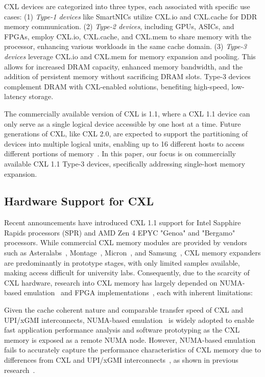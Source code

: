 CXL devices are categorized into three types, each associated with specific use cases: (1) \textit{Type-1 devices} like SmartNICs utilize CXL.io and CXL.cache for DDR memory communication. (2) \textit{Type-2 devices}, including GPUs, ASICs, and FPGAs, employ CXL.io, CXL.cache, and CXL.mem to share memory with the processor, enhancing various workloads in the same cache domain. (3) \textit{Type-3 devices} leverage CXL.io and CXL.mem for memory expansion and pooling. This allows for increased DRAM capacity, enhanced memory bandwidth, and the addition of persistent memory without sacrificing DRAM slots. Type-3 devices complement DRAM with CXL-enabled solutions, benefiting high-speed, low-latency storage.


The commercially available version of CXL is 1.1, where a CXL 1.1 device can only serve as a single logical device accessible by one host at a time. Future generations of CXL, like CXL 2.0, are expected to support the partitioning of devices into multiple logical units, enabling up to 16 different hosts to access different portions of memory~\cite{sharma2023introduction}. In this paper, our focus is on commercially available CXL 1.1 Type-3 devices, specifically addressing single-host memory expansion.



\subsection{Hardware Support for CXL}
\label{ssec:cxlhardware}

Recent announcements have introduced CXL 1.1 support for Intel Sapphire Rapids processors (SPR) \cite{SPR} and AMD Zen 4 EPYC "Genoa" and "Bergamo" processors\cite{amdgenoabergamo}. While commercial CXL memory modules are provided by vendors such as Asteralabs~\cite{A1000}, Montage~\cite{mxc}, Micron~\cite{micron}, and Samsung~\cite{smt}, CXL memory expanders are predominantly in prototype stages, with only limited samples available, making access difficult for university labs. Consequently, due to the scarcity of CXL hardware, research into CXL memory has largely depended on NUMA-based emulation~\cite{pond,tpp} and FPGA implementations~\cite{demystify, directcxl}, each with inherent limitations:

 Given the cache coherent nature and comparable transfer speed of CXL and UPI/xGMI interconnects, NUMA-based emulation~\cite{pond, tpp} is widely adopted to enable fast application performance analysis and software prototyping as the CXL memory is exposed as a remote NUMA node. However, NUMA-based emulation fails to accurately capture the performance characteristics of CXL memory due to differences from CXL and UPI/xGMI interconnects~\cite{cxldatabase}, as shown in previous research~\cite{demystify}.

